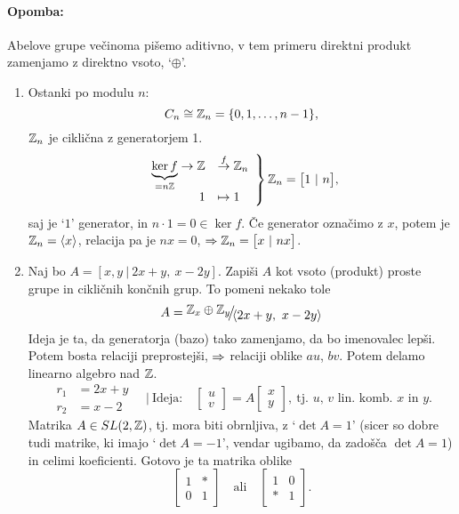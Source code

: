 \paragraph{Opomba:}
Abelove grupe ve\v cinoma pi\v semo aditivno, v tem primeru direktni produkt zamenjamo z direktno vsoto, `$\oplus$'.

\begin{zgled}
	\begin{enumerate}
		\item{Ostanki po modulu $n$:
			\[
				C_n \cong \mathbb{Z}_n = \{0, 1, \ldots, n-1\},
			\]
			$\mathbb{Z}_n$ je cikli\v cna z generatorjem 1.
			\[
				\left.
				\begin{array}{rl}
					\underbrace{\ker f}_{= n\mathbb{Z}} \to \mathbb{Z} &\stackrel{f}{\to} \mathbb{Z}_n \\
					1 &\mapsto 1
				\end{array}
				\right\} \mathbb{Z}_n = \big[1\ |\ n\big],
			\]
			saj je `$1$' generator, in $n \cdot 1 = 0 \in \ker f$. \v Ce generator ozna\v cimo z $x$, potem je
			$\mathbb{Z}_n = \langle x \rangle$, relacija pa je $nx =0$, $\Rightarrow \mathbb{Z}_n = \big[x\ |\ nx\big]$.
		}
		\item{Naj bo $A = [x, y\ |\ 2x + y,\ x - 2y]$. Zapi\v si $A$ kot vsoto (produkt) proste grupe in cikli\v cnih kon\v cnih grup. To pomeni nekako tole
			\[
				A = \quot{\Z_x \oplus \Z_y}{\langle 2x + y,\ x - 2y\rangle}
			\]
			Ideja je ta, da generatorja (bazo) tako zamenjamo, da bo imenovalec lep\v si. Potem bosta relaciji preprostej\v si, $\Rightarrow$ relaciji oblike $au$, $bv$.
			Potem delamo linearno algebro nad $\mathbb{Z}$.
			\[
				\left.
				\begin{array}{rl}
					r_1 &= 2x + y \\
					r_2 &= x - 2
				\end{array}
				\right. \quad \Bigg|\ \text{Ideja:}\quad
				\begin{bmatrix}
					u \\ v
				\end{bmatrix} = A
				\begin{bmatrix}
					x \\ y
				\end{bmatrix},\ \text{tj. $u$, $v$ lin. komb. $x$ in $y$.}
			\]
			Matrika $A \in SL(2, \mathbb{Z})$, tj. mora biti obrnljiva, z `$\det A = 1$' (sicer so dobre tudi matrike, ki imajo `$\det A  = -1$',
			vendar ugibamo, da zado\v s\v ca $\det A = 1$) in celimi koeficienti. Gotovo je ta matrika oblike
			\[
				\begin{bmatrix}
					1 & * \\ 0 & 1
				\end{bmatrix} \quad \text{ali} \quad \begin{bmatrix}
					1 & 0 \\ * & 1 \end{bmatrix}.
			\]	
			\pagebreak

}
\end{enumerate}
\end{zgled}
